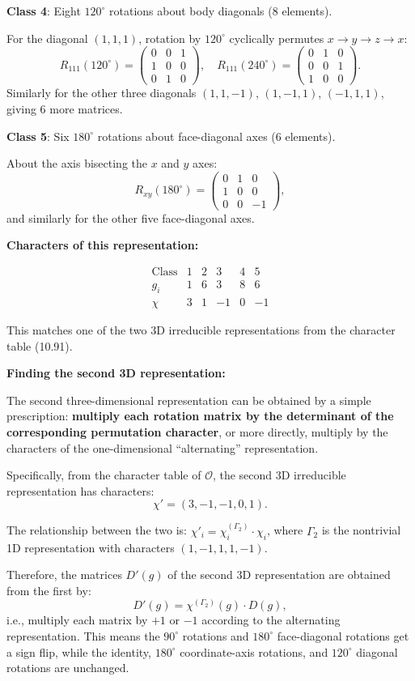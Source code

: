\documentclass[12pt]{article}
\begin{document}
\textbf{Class 4}: Eight $120^\circ$ rotations about body diagonals (8 elements).

For the diagonal $(1,1,1)$, rotation by $120^\circ$ cyclically permutes $x \to y \to z \to x$:
\[
R_{111}(120^\circ) = \begin{pmatrix} 0 & 0 & 1 \\ 1 & 0 & 0 \\ 0 & 1 & 0 \end{pmatrix}, \quad
R_{111}(240^\circ) = \begin{pmatrix} 0 & 1 & 0 \\ 0 & 0 & 1 \\ 1 & 0 & 0 \end{pmatrix}.
\]
Similarly for the other three diagonals $(1,1,-1)$, $(1,-1,1)$, $(-1,1,1)$, giving 6 more matrices.

\textbf{Class 5}: Six $180^\circ$ rotations about face-diagonal axes (6 elements).

About the axis bisecting the $x$ and $y$ axes:
\[
R_{xy}(180^\circ) = \begin{pmatrix} 0 & 1 & 0 \\ 1 & 0 & 0 \\ 0 & 0 & -1 \end{pmatrix},
\]
and similarly for the other five face-diagonal axes.

\medskip
\noindent\textbf{Characters of this representation:}

\[
\begin{array}{c|ccccc}
\text{Class} & 1 & 2 & 3 & 4 & 5 \\
g_i & 1 & 6 & 3 & 8 & 6 \\
\hline
\chi & 3 & 1 & -1 & 0 & -1
\end{array}
\]

This matches one of the two 3D irreducible representations from the character table (10.91).

\medskip
\noindent\textbf{Finding the second 3D representation:}

The second three-dimensional representation can be obtained by a simple prescription: \textbf{multiply each rotation matrix by the determinant of the corresponding permutation character}, or more directly, multiply by the characters of the one-dimensional ``alternating'' representation.

Specifically, from the character table of $\mathscr{O}$, the second 3D irreducible representation has characters:
\[
\chi' = (3, -1, -1, 0, 1).
\]

The relationship between the two is: $\chi'_i = \chi^{(\Gamma_2)}_i \cdot \chi_i$, where $\Gamma_2$ is the nontrivial 1D representation with characters $(1, -1, 1, 1, -1)$.

Therefore, the matrices $D'(g)$ of the second 3D representation are obtained from the first by:
\[
\boxed{D'(g) = \chi^{(\Gamma_2)}(g) \cdot D(g),}
\]
i.e., multiply each matrix by $+1$ or $-1$ according to the alternating representation. This means the $90^\circ$ rotations and $180^\circ$ face-diagonal rotations get a sign flip, while the identity, $180^\circ$ coordinate-axis rotations, and $120^\circ$ diagonal rotations are unchanged.
\end{document}
